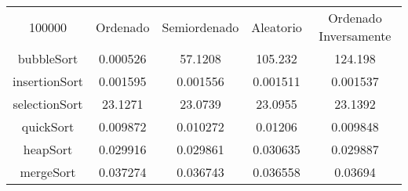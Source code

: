 \begin{longtable}{c | c | c | c | c}
100000 & Ordenado & Semiordenado & Aleatorio & Ordenado Inversamente \\
bubbleSort & 0.000526 & 57.1208 & 105.232 & 124.198 \\
insertionSort & 0.001595 & 0.001556 & 0.001511 & 0.001537 \\
selectionSort & 23.1271 & 23.0739 & 23.0955 & 23.1392 \\
quickSort & 0.009872 & 0.010272 & 0.01206 & 0.009848 \\
heapSort & 0.029916 & 0.029861 & 0.030635 & 0.029887 \\
mergeSort & 0.037274 & 0.036743 & 0.036558 & 0.03694 \\
\end{longtable}